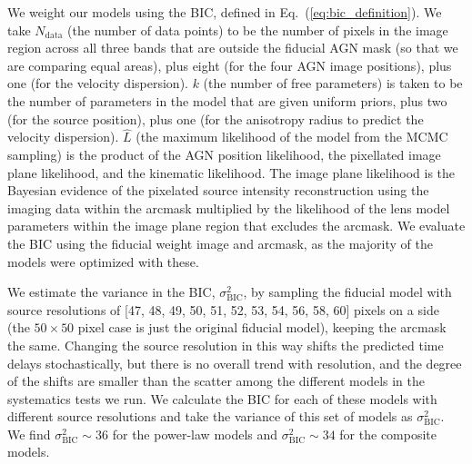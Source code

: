 \documentclass[longauth]{aa}
\begin{document}
We weight our models using the BIC, defined in Eq.~(\ref{eq:bic_definition}).  We take $N_{\mathrm{data}}$ (the number of data points) to be the number of pixels in the image region across all three bands that are outside the fiducial AGN mask (so that we are comparing equal areas), plus eight (for the four AGN image positions), plus one (for the velocity dispersion).  $k$ (the number of free parameters) is taken to be the number of parameters in the model that are given uniform priors, plus two (for the source position), plus one (for the anisotropy radius to predict the velocity dispersion).  $\hat{L}$ (the maximum likelihood of the model from the MCMC sampling) is the product of the AGN position likelihood, the pixellated image plane likelihood, and the kinematic likelihood. The image plane likelihood is the Bayesian evidence of the pixelated source intensity reconstruction using the imaging data within the arcmask \citep[which marginalizes over the source surface brightness pixel parameters and is thus the likelihood of the lens parameters excluding the source pixel parameters; see Eqs. 12 and 13 in][]{Suyu10b} multiplied by the likelihood of the lens model parameters within the image plane region that excludes the arcmask.  We evaluate the BIC using the fiducial weight image and arcmask, as the majority of the models were optimized with these.

We estimate the variance in the BIC, $\sigma_{\mathrm{BIC}}^{2}$, by sampling the fiducial model with source resolutions of [47, 48, 49, 50, 51, 52, 53, 54, 56, 58, 60] pixels on a side (the $50\times50$ pixel case is just the original fiducial model), keeping the arcmask the same. Changing the source resolution in this way shifts the predicted time delays stochastically, but there is no overall trend with resolution, and the degree of the shifts are smaller than the scatter among the different models in the systematics tests we run.  We calculate the BIC for each of these models with different source resolutions and take the variance of this set of models as $\sigma_{\mathrm{BIC}}^{2}$.  We find $\sigma_{\mathrm{BIC}}^{2} \sim 36$ for the power-law models and $\sigma_{\mathrm{BIC}}^{2} \sim 34$ for the composite models.
\end{document}
